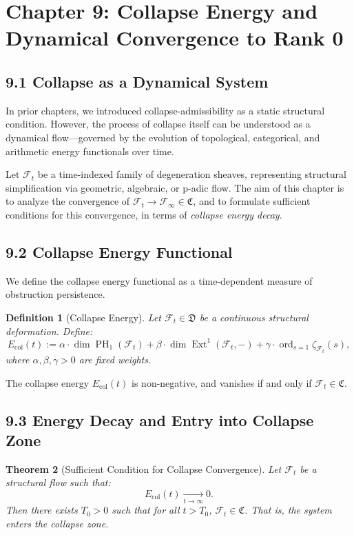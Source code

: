 \documentclass[11pt]{article}
\newtheorem{theorem}{Theorem}[section]
\newtheorem{definition}[theorem]{Definition}
\DeclareMathOperator{\Ext}{Ext}
\DeclareMathOperator{\PH}{PH}
\newcommand{\ord}{\operatorname{ord}}
\begin{document}
\section{Chapter 9: Collapse Energy and Dynamical Convergence to Rank 0}
\label{sec:collapse-energy}

\subsection*{9.1 Collapse as a Dynamical System}

In prior chapters, we introduced collapse-admissibility as a static structural condition. However, the process of collapse itself can be understood as a dynamical flow—governed by the evolution of topological, categorical, and arithmetic energy functionals over time.

Let \( \mathcal{F}_t \) be a time-indexed family of degeneration sheaves, representing structural simplification via geometric, algebraic, or p-adic flow. The aim of this chapter is to analyze the convergence of \( \mathcal{F}_t \to \mathcal{F}_\infty \in \mathfrak{C} \), and to formulate sufficient conditions for this convergence, in terms of \emph{collapse energy decay}.

\subsection*{9.2 Collapse Energy Functional}

We define the collapse energy functional as a time-dependent measure of obstruction persistence.

\begin{definition}[Collapse Energy]
Let \( \mathcal{F}_t \in \mathfrak{D} \) be a continuous structural deformation. Define:
\[
E_{\mathrm{col}}(t) := \alpha \cdot \dim \PH_1(\mathcal{F}_t)
+ \beta \cdot \dim \Ext^1(\mathcal{F}_t, -)
+ \gamma \cdot \ord_{s=1} \zeta_{\mathcal{F}_t}(s),
\]
where \( \alpha, \beta, \gamma > 0 \) are fixed weights.
\end{definition}

The collapse energy \( E_{\mathrm{col}}(t) \) is non-negative, and vanishes if and only if \( \mathcal{F}_t \in \mathfrak{C} \).

\subsection*{9.3 Energy Decay and Entry into Collapse Zone}

\begin{theorem}[Sufficient Condition for Collapse Convergence]
\label{thm:energy-decay}
Let \( \mathcal{F}_t \) be a structural flow such that:
\[
E_{\mathrm{col}}(t) \xrightarrow[t \to \infty]{} 0.
\]
Then there exists \( T_0 > 0 \) such that for all \( t > T_0 \), \( \mathcal{F}_t \in \mathfrak{C} \). That is, the system enters the collapse zone.
\end{theorem}
\end{document}
